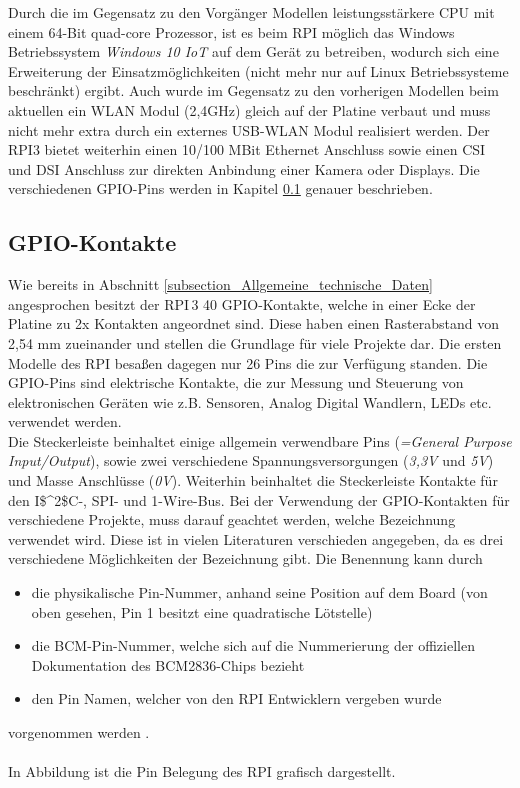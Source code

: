 Durch die im Gegensatz zu den Vorgänger Modellen leistungsstärkere CPU mit einem 64-Bit quad-core Prozessor, ist es beim RPI möglich das Windows Betriebssystem \textit{Windows 10 IoT} auf dem Gerät zu betreiben, wodurch sich eine Erweiterung der Einsatzmöglichkeiten (nicht mehr nur auf Linux Betriebssysteme beschränkt) ergibt. Auch wurde im Gegensatz zu den vorherigen Modellen beim aktuellen ein WLAN Modul (2,4\;GHz) gleich auf der Platine verbaut und muss nicht mehr extra durch ein externes USB-WLAN Modul realisiert werden. Der \ac{RPI}3 bietet weiterhin einen 10/100 MBit Ethernet Anschluss sowie einen \ac{CSI} und \ac{DSI} Anschluss zur direkten Anbindung einer Kamera oder Displays. Die verschiedenen GPIO-Pins werden in Kapitel \ref{subsection_GPIO} genauer beschrieben.

\subsection{GPIO-Kontakte}
\label{subsection_GPIO}
Wie bereits in Abschnitt \ref{subsection_Allgemeine_technische_Daten} angesprochen besitzt der \ac{RPI}\,3 40 GPIO-Kontakte, welche in einer Ecke der Platine zu 2\;x Kontakten angeordnet sind. Diese haben einen Rasterabstand von 2,54 mm zueinander und stellen die Grundlage für viele Projekte dar. Die ersten Modelle des \ac{RPI} besaßen dagegen nur 26 Pins die zur Verfügung standen. Die GPIO-Pins sind elektrische Kontakte, die zur Messung und Steuerung von elektronischen Geräten wie z.B. Sensoren, Analog Digital Wandlern, LEDs etc. verwendet werden.\\
Die Steckerleiste beinhaltet einige allgemein verwendbare Pins (\textit{=\;General Purpose Input\;/\;Output}), sowie zwei verschiedene Spannungsversorgungen (\textit{3,3\;V} und \textit{5\;V}) und Masse Anschlüsse (\textit{0\;V}). Weiterhin beinhaltet die Steckerleiste Kontakte für den \ac{I$^2$C}-, \ac{SPI}- und 1-Wire-Bus. Bei der Verwendung der GPIO-Kontakten für verschiedene Projekte, muss darauf geachtet werden, welche Bezeichnung verwendet wird. Diese ist in vielen Literaturen verschieden angegeben, da es drei verschiedene Möglichkeiten der Bezeichnung gibt. Die Benennung kann durch
\begin{itemize}
\item die physikalische Pin-Nummer, anhand seine Position auf dem Board (von oben gesehen, Pin 1 besitzt eine quadratische Lötstelle)
\item die BCM-Pin-Nummer, welche sich auf die Nummerierung der offiziellen Dokumentation des BCM2836-Chips bezieht
\item den Pin Namen, welcher von den \ac{RPI} Entwicklern vergeben wurde 
\end{itemize} 
vorgenommen werden \citep{Raspberri_Pi_Handbuch}.\\\\
In Abbildung ist die Pin Belegung des \ac{RPI} grafisch dargestellt.

